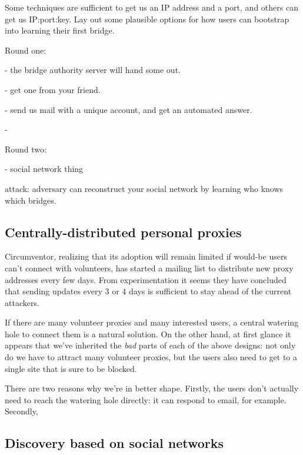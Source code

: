\documentclass{llncs}
\begin{document}
Some techniques are sufficient to get us an IP address and a port,
and others can get us IP:port:key. Lay out some plausible options
for how users can bootstrap into learning their first bridge.

Round one:

- the bridge authority server will hand some out.

- get one from your friend.

- send us mail with a unique account, and get an automated answer.

- 

Round two:

- social network thing

attack: adversary can reconstruct your social network by learning who
knows which bridges.

\subsection{Centrally-distributed personal proxies}

Circumventor, realizing that its adoption will remain limited if would-be
users can't connect with volunteers, has started a mailing list to
distribute new proxy addresses every few days. From experimentation
it seems they have concluded that sending updates every 3 or 4 days is
sufficient to stay ahead of the current attackers.

If there are many volunteer proxies and many interested users, a central
watering hole to connect them is a natural solution. On the other hand,
at first glance it appears that we've inherited the \emph{bad} parts of
each of the above designs: not only do we have to attract many volunteer
proxies, but the users also need to get to a single site that is sure
to be blocked.

There are two reasons why we're in better shape. Firstly, the users don't
actually need to reach the watering hole directly: it can respond to
email, for example. Secondly, 




\subsection{Discovery based on social networks}
\end{document}

